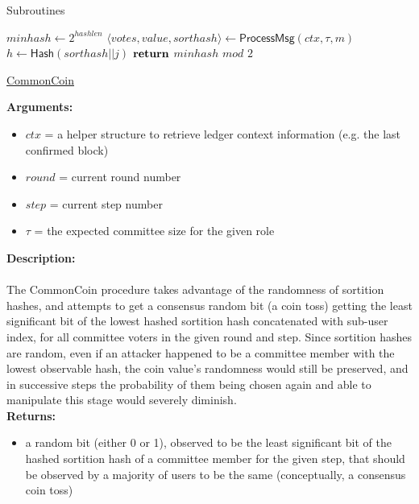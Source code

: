 \documentclass[10pt,a4paper]{article}
\begin{document}
\begin{section}{Subroutines}
\begin{algorithm}[H]
    \begin{algorithmic}[H]

    \State $minhash \gets 2^{hashlen}$
        \State $\langle votes,value,sorthash\rangle \gets \mathsf{ProcessMsg}(ctx,\tau,m)$
                \State $h \gets \mathsf{Hash}(sorthash||j)$
        \EndFor
    \EndFor
    $\Return$ $minhash$ $mod$ $2$
    \EndFunction
    \end{algorithmic}
    \caption{\underline{CommonCoin}}
\end{algorithm}


\noindent \textbf{Arguments:}
\begin{itemize}
    \item $ctx$ = a helper structure to retrieve ledger context information (e.g. the last confirmed block)
    \item $round$ = current round number
    \item $step$ = current step number
    \item $\tau$ = the expected committee size for the given role
  \end{itemize}

\noindent \textbf{Description:}\\\\
The CommonCoin procedure takes advantage of the randomness of sortition hashes, and attempts to
get a consensus random bit (a coin toss) getting the least significant bit of the lowest hashed
sortition hash concatenated with sub-user index, for all committee voters in the given round and step.
Since sortition hashes are random, even if an attacker happened to be a committee member with the lowest observable hash,
the coin value's randomness would still be preserved, and in successive steps the probability of them being chosen again and
able to manipulate this stage would severely diminish.\\

\noindent \textbf{Returns:}
\begin{itemize}
    \item a random bit (either 0 or 1), observed to be the least significant bit of the hashed sortition hash of a committee member for the given step,
    that should be observed by a majority of users to be the same (conceptually, a consensus coin toss)
  \end{itemize}

\end{section}
\end{document}
